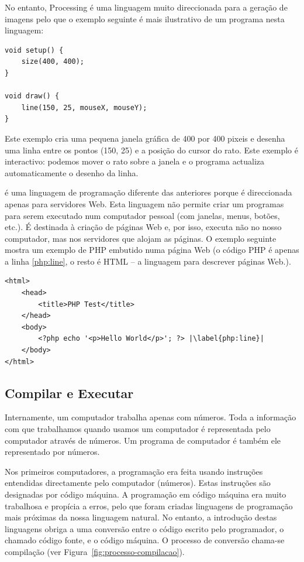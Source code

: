 \begin{description}
No entanto, Processing é uma linguagem muito direccionada para a geração de imagens pelo que o exemplo seguinte é mais ilustrativo de um programa nesta linguagem:
\begin{lstlisting}
void setup() {
	size(400, 400);
}
 
void draw() {
	line(150, 25, mouseX, mouseY);
}
\end{lstlisting}
Este exemplo cria uma pequena janela gráfica de 400 por 400 pixeis e desenha uma linha entre os pontos (150, 25) e a posição do cursor do rato. Este exemplo é interactivo: podemos mover o rato sobre a janela e o programa actualiza automaticamente o desenho da linha. 

\item[PHP] é uma linguagem de programação diferente das anteriores porque é direccionada apenas para servidores Web. Esta linguagem não permite criar um programas para serem executado num computador pessoal (com janelas, menus, botões, etc.). É destinada à criação de páginas Web e, por isso, executa não no nosso computador, mas nos servidores que alojam as páginas. O exemplo seguinte mostra um exemplo de PHP embutido numa página Web (o código PHP é apenas a linha \ref{php:line}, o resto é HTML -- a linguagem para descrever páginas Web.).
\begin{lstlisting}[escapechar=|]
<html>
	<head>  
		<title>PHP Test</title>
	</head>
	<body>
		<?php echo '<p>Hello World</p>'; ?> |\label{php:line}|
	</body>
</html>
\end{lstlisting}

\end{description}

\subsection{Compilar e Executar}
Internamente, um computador trabalha apenas com números. Toda a informação com que trabalhamos quando usamos um computador é representada pelo computador através de números. Um programa de computador é também ele representado por números. 

Nos primeiros computadores, a programação era feita usando instruções entendidas directamente pelo computador (números). Estas instruções são designadas por código máquina. 
A programação em código máquina era muito trabalhosa e propícia a erros, pelo que foram criadas linguagens de programação  mais próximas da nossa linguagem natural. No entanto, a introdução destas linguagens obriga a uma conversão entre o código escrito pelo programador, o chamado código fonte, e o código máquina. O processo de conversão chama-se compilação (ver Figura~\ref{fig:processo-compilacao}). 

